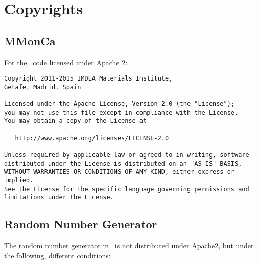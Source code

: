 \section{Copyrights}
\subsection{MMonCa}
For the \MMonCa\ code licensed under Apache 2:

\begin{verbatim}
Copyright 2011-2015 IMDEA Materials Institute, 
Getafe, Madrid, Spain
 
Licensed under the Apache License, Version 2.0 (the "License");
you may not use this file except in compliance with the License.
You may obtain a copy of the License at

   http://www.apache.org/licenses/LICENSE-2.0

Unless required by applicable law or agreed to in writing, software
distributed under the License is distributed on an "AS IS" BASIS,
WITHOUT WARRANTIES OR CONDITIONS OF ANY KIND, either express or implied.
See the License for the specific language governing permissions and
limitations under the License.
\end{verbatim}

\subsection{Random Number Generator}
The random number generator in \MMonCa\ is not distributed under Apache2, but under the following, different conditions:

